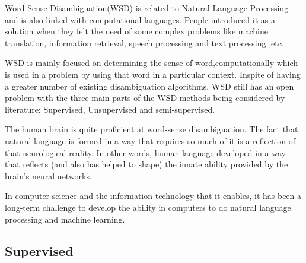 Word Sense Disambiguation(WSD) is related to Natural Language Processing and is also linked with computational languages. 
People introduced it as a solution when they felt the need of some complex problems like machine translation, information retrieval, speech processing and text processing ,etc. 

WSD is mainly focused on determining the sense of word,computationally which is used in a problem by using that word in a particular context. 
Inspite of having a greater number of existing disambiguation algorithms, WSD still has an open problem with the three main parts of the WSD methods being considered by literature: Supervised, Unsupervised and semi-supervised. 

The human brain is quite proficient at word-sense disambiguation. 
The fact that natural language is formed in a way that requires so much of it is a reflection of that neurological reality. 
In other words, human language developed in a way that reflects (and also has helped to shape) the innate ability provided by the brain's neural networks. 

In computer science and the information technology that it enables, it has been a long-term challenge to develop the ability in computers to do natural language processing and machine learning. 

\subsection*{Supervised}

